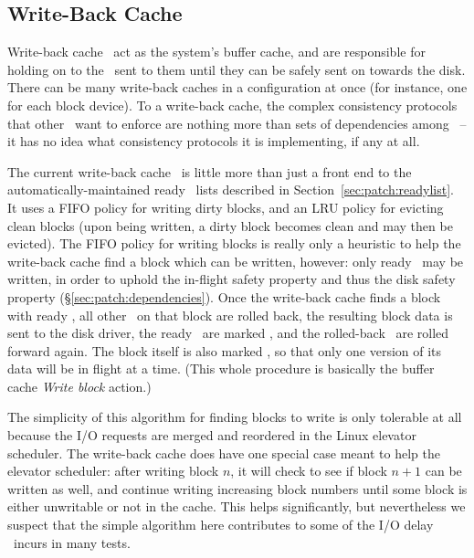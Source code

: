 \subsection{Write-Back Cache}
\label{sec:modules:wbcache}

Write-back cache \modules\ act as the system's buffer cache, and are responsible
for holding on to the \chdescs\ sent to them until they can be safely sent on
towards the disk. There can be many write-back caches in a configuration at once
(for instance, one for each block device). To a write-back cache, the complex
consistency protocols that other \modules\ want to enforce are nothing more than
sets of dependencies among \chdescs\ -- it has no idea what consistency
protocols it is implementing, if any at all.

The current write-back cache \module\ is little more than just a front end to
the automatically-maintained ready \chdesc\ lists described in
Section~\ref{sec:patch:readylist}.
%
It uses a FIFO policy for writing dirty blocks, and an LRU policy for evicting
clean blocks (upon being written, a dirty block becomes clean and may then be
evicted).
%
The FIFO policy for writing blocks is really only a heuristic to help the
write-back cache find a block which can be written, however: only ready
\chdescs\ may be written, in order to uphold the in-flight safety property and
thus the disk safety property (\S\ref{sec:patch:dependencies}).
%
Once the write-back cache finds a block with ready \chdescs, all other \chdescs\
on that block are rolled back, the resulting block data is sent to the disk
driver, the ready \chdescs\ are marked \PInfst, and the rolled-back \chdescs\
are rolled forward again. The block itself is also marked \PInfst, so that only
one version of its data will be in flight at a time. (This whole procedure is
basically the buffer cache \textit{Write block} action.)

The simplicity of this algorithm for finding blocks to write is only tolerable
at all because the I/O requests are merged and reordered in the Linux elevator
scheduler. The write-back cache does have one special case meant to help the
elevator scheduler: after writing block $n$, it will check to see if block $n+1$
can be written as well, and continue writing increasing block numbers until some
block is either unwritable or not in the cache. This helps significantly, but
nevertheless we suspect that the simple algorithm here contributes to some of
the I/O delay \Kudos\ incurs in many tests.

